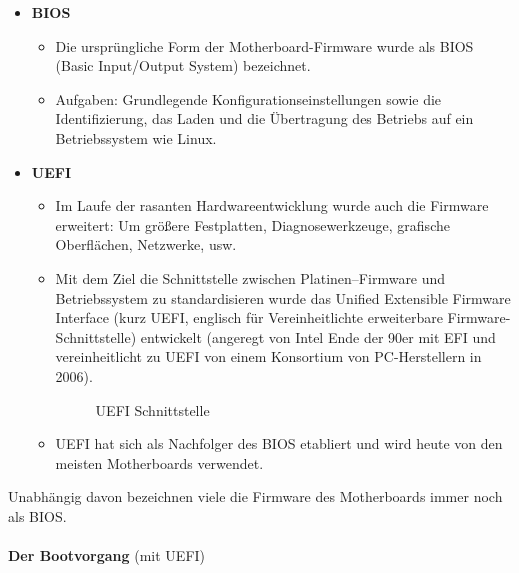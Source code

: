 \begin{itemize}
	\item \textbf{BIOS}
\begin{itemize}
	\item Die ursprüngliche Form der Motherboard-Firmware wurde als BIOS (Basic Input/Output System) bezeichnet.
	\item Aufgaben: Grundlegende Konfigurationseinstellungen sowie die Identifizierung, das Laden und die Übertragung des Betriebs auf ein Betriebssystem wie Linux.
\end{itemize}
\item \textbf{UEFI}
\begin{itemize}
	\item Im Laufe der rasanten Hardwareentwicklung wurde auch die Firmware erweitert: Um größere Festplatten, Diagnosewerkzeuge, grafische Oberflächen, Netzwerke, usw.
	\item Mit dem Ziel die Schnittstelle zwischen Platinen--Firmware und Betriebssystem zu standardisieren wurde das Unified Extensible Firmware Interface (kurz UEFI, englisch für Vereinheitlichte erweiterbare Firmware-Schnittstelle) entwickelt (angeregt von Intel Ende der 90er mit EFI und vereinheitlicht zu UEFI von einem Konsortium von PC-Herstellern in 2006).
	\begin{figure}[h!]
		\centering
		\caption[UEFI als Schnittstelle]{UEFI Schnittstelle}
		\label{fig:uefiinterface}
	\end{figure}
	\item UEFI hat sich als Nachfolger des BIOS etabliert und wird heute von den meisten Motherboards verwendet.
\end{itemize}
\end{itemize}
Unabhängig davon bezeichnen viele die Firmware des Motherboards immer noch als BIOS.
~\\~\\
\textbf{Der Bootvorgang} (mit UEFI)
